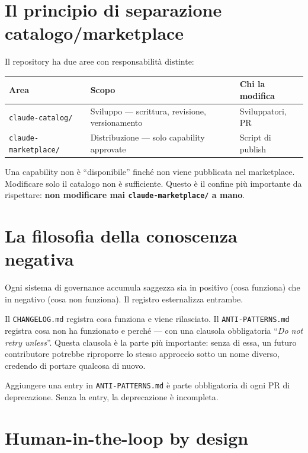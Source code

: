 \documentclass[12pt,a4paper,twoside]{book}
\begin{document}
\section{Il principio di separazione catalogo/marketplace}

Il repository ha due aree con responsabilità distinte:

\begin{center}
\begin{tabular}{lll}
\toprule
\textbf{Area} & \textbf{Scopo} & \textbf{Chi la modifica} \\
\midrule
\texttt{claude-catalog/} & Sviluppo — scrittura, revisione, versionamento & Sviluppatori, PR \\
\texttt{claude-marketplace/} & Distribuzione — solo capability approvate & Script di publish \\
\bottomrule
\end{tabular}
\end{center}

Una capability non è ``disponibile'' finché non viene pubblicata nel marketplace. Modificare solo il catalogo non è sufficiente. Questo è il confine più importante da rispettare: \textbf{non modificare mai \texttt{claude-marketplace/} a mano}.

\section{La filosofia della conoscenza negativa}

Ogni sistema di governance accumula saggezza sia in positivo (cosa funziona) che in negativo (cosa non funziona). Il registro esternalizza entrambe.

Il \texttt{CHANGELOG.md} registra cosa funziona e viene rilasciato. Il \texttt{ANTI-PATTERNS.md} registra cosa non ha funzionato e perché — con una clausola obbligatoria ``\textit{Do not retry unless}''. Questa clausola è la parte più importante: senza di essa, un futuro contributore potrebbe riproporre lo stesso approccio sotto un nome diverso, credendo di portare qualcosa di nuovo.

\begin{attenzione}
Aggiungere una entry in \texttt{ANTI-PATTERNS.md} è parte obbligatoria di ogni PR di deprecazione. Senza la entry, la deprecazione è incompleta.
\end{attenzione}

\section{Human-in-the-loop by design}
\end{document}
